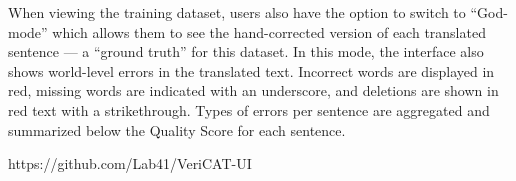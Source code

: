 When viewing the training dataset, users also have the option to switch to “God-mode” which allows them to see the hand-corrected version of each translated sentence — a “ground truth” for this dataset. In this mode, the interface also shows world-level errors in the translated text. Incorrect words are displayed in red, missing words are indicated with an underscore, and deletions are shown in red text with a strikethrough. Types of errors per sentence are aggregated and summarized below the Quality Score for each sentence. 

https://github.com/Lab41/VeriCAT-UI

  


